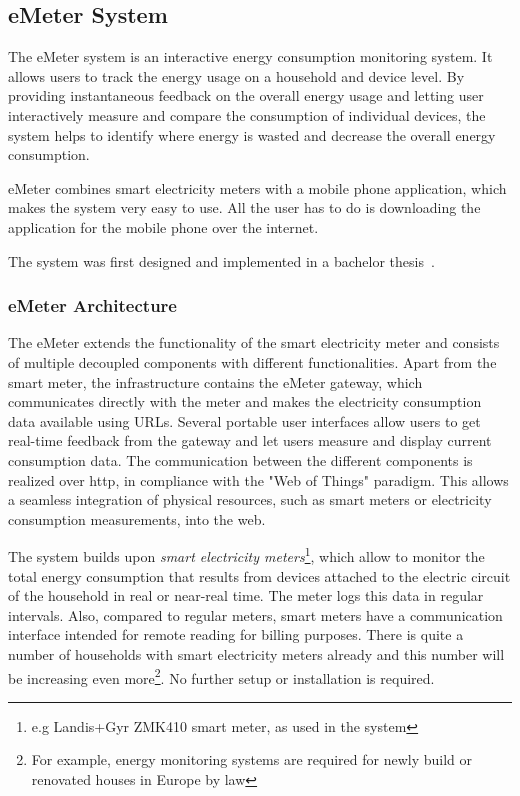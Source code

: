 \subsection{eMeter System}
The eMeter system is an interactive energy consumption monitoring system. It allows users to track the energy usage on a household and device level. By providing instantaneous feedback on the overall energy usage and letting user interactively measure and compare the consumption of individual devices, the system helps to identify where energy is wasted and decrease the overall energy consumption.  

eMeter combines smart electricity meters with a mobile phone application, which makes the system very easy to use.  All the user has to do is downloading the application for the mobile phone over the internet.

The system was first designed and implemented in a bachelor thesis~\cite{roediger}. 

\subsubsection{eMeter Architecture}\label{sec:emeter_architecture}
The eMeter extends the functionality of the smart electricity meter and consists of multiple decoupled components with different functionalities. Apart from the smart meter, the infrastructure contains the eMeter gateway, which communicates directly with the meter and makes the electricity consumption data available using URLs. Several portable user interfaces allow users to get real-time feedback from the gateway and let users measure and display current consumption data. The communication between the different components is realized over http, in compliance with the "Web of Things" paradigm\cite{guinardWoT:inbook:2010}. This allows a seamless integration of physical resources, such as smart meters or electricity consumption measurements, into the web\cite{recognize_home_appliances}. 

The system builds upon \textit{smart electricity meters}\footnote{e.g Landis+Gyr ZMK410 smart meter, as used in the system}, which allow to monitor the total energy consumption that results from devices attached to the electric circuit of the household in real or near-real time. The meter logs this data in regular intervals. Also, compared to regular meters, smart meters have a communication interface intended for remote reading for billing purposes. There is quite a number of households with smart electricity meters already and this number will be increasing even more\footnote{For example, energy monitoring systems are required for newly build or renovated houses in Europe by law\cite{eu_emeter}}. No further setup or installation is required.

